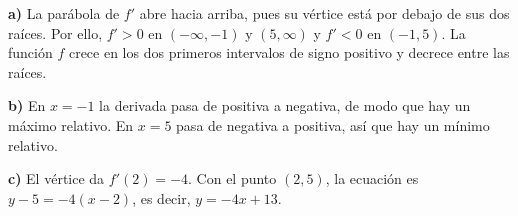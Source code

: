 \textbf{a)} La parábola de $f'$ abre hacia arriba, pues su vértice está por debajo de sus dos raíces. Por ello, $f'>0$ en $(-\infty,-1)$ y $(5,\infty)$ y $f'<0$ en $(-1,5)$. La función $f$ crece en los dos primeros intervalos de signo positivo y decrece entre las raíces.

\textbf{b)} En $x=-1$ la derivada pasa de positiva a negativa, de modo que hay un máximo relativo. En $x=5$ pasa de negativa a positiva, así que hay un mínimo relativo.

\textbf{c)} El vértice da $f'(2)=-4$. Con el punto $(2,5)$, la ecuación es $y-5=-4(x-2)$, es decir, $\boxed{y=-4x+13}$.
